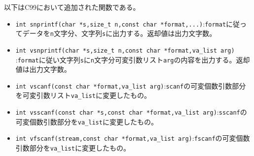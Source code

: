 以下はC99において追加された関数である。
\begin{itemize}
\item \verb|int snprintf(char *s,size_t n,const char *format,...)|:\verb|format|に従ってデータを\verb|n|文字分、文字列\verb|s|に出力する。返却値は出力文字数。
\item \verb|int vsnprintf(char *s,size_t n,const char *format,va_list arg)|\\:\verb|format|に従い文字列\verb|s|に\verb|n|文字分可変引数リスト\verb|arg|の内容を出力する。返却値は出力文字数。
\item \verb|int vscanf(const char *format,va_list arg)|:\verb|scanf|の可変個数引数部分を可変引数リスト\verb|va_list|に変更したもの。
\item \verb|int vsscanf(const char *s,const char *format,va_list arg)|:\verb|sscanf|の可変個数引数部分を\verb|va_list|に変更したもの。
\item \verb|int vfscanf(stream,const char *format,va_list arg)|:\verb|fscanf|の可変個数引数部分を\verb|va_list|に変更したもの。
\end{itemize}

